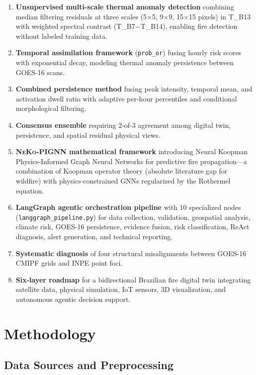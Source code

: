 \documentclass[5p,twocolumn]{elsarticle}
\newcommand{\code}[1]{\texttt{#1}}
\newcommand{\abbrev}[1]{{\small\textsc{#1}}}
\begin{document}
\begin{enumerate}
  \item \textbf{Unsupervised multi-scale thermal anomaly detection} combining median filtering residuals at three scales (5$\times$5, 9$\times$9, 15$\times$15 pixels) in \abbrev{T\_B13} with weighted spectral contrast (\abbrev{T\_B7}$-$\abbrev{T\_B14}), enabling fire detection without labeled training data.
  \item \textbf{Temporal assimilation framework} (\code{prob\_or}) fusing hourly risk scores with exponential decay, modeling thermal anomaly persistence between \abbrev{GOES-16} scans.
  \item \textbf{Combined persistence method} fusing peak intensity, temporal mean, and activation dwell ratio with adaptive per-hour percentiles and conditional morphological filtering.
  \item \textbf{Consensus ensemble} requiring 2-of-3 agreement among digital twin, persistence, and spatial residual physical views.
  \item \textbf{\abbrev{NeKo-PIGNN} mathematical framework} introducing Neural Koopman Physics-Informed Graph Neural Networks for predictive fire propagation---a combination of Koopman operator theory (absolute literature gap for wildfire) with physics-constrained \abbrev{GNN}s regularized by the Rothermel equation.
  \item \textbf{LangGraph agentic orchestration pipeline} with 10 specialized nodes (\texttt{langgraph\_pipeline.py}) for data collection, validation, geospatial analysis, climate risk, \abbrev{GOES-16} persistence, evidence fusion, risk classification, ReAct diagnosis, alert generation, and technical reporting.
  \item \textbf{Systematic diagnosis} of four structural misalignments between \abbrev{GOES-16} \abbrev{CMIPF} grids and \abbrev{INPE} point foci.
  \item \textbf{Six-layer roadmap} for a bidirectional Brazilian fire digital twin integrating satellite data, physical simulation, IoT sensors, 3D visualization, and autonomous agentic decision support.
\end{enumerate}

\section{Methodology}
\label{sec:method}

\subsection{Data Sources and Preprocessing}
\end{document}
